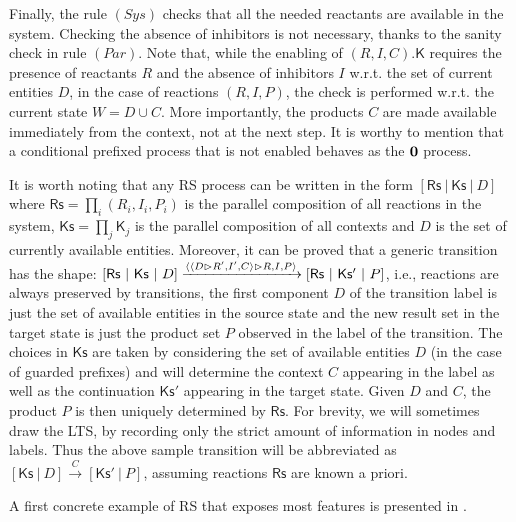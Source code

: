 Finally, the rule $(\textit{Sys})$ checks that all the needed reactants are available in the system. Checking the absence of inhibitors  is not necessary, thanks to the sanity check in rule $(\textit{Par})$.
Note that, while the enabling of $(R,I,C).\mathsf{K}$ requires the presence of reactants $R$ and the absence of inhibitors $I$ w.r.t. the set of current entities $D$, in the case of reactions $(R,I,P)$, the check is performed w.r.t. the current state $W=D\cup C$.
More importantly, the products $C$ are made available immediately from the context, not at the next step.
It is worthy to mention that a conditional prefixed process that is not enabled behaves as the $\mathbf{0}$ process.

\begin{remark}\label{rem:shortlts}
It is worth noting that any RS process can be written in the form $[\mathsf{Rs}~|~\mathsf{Ks}~|~D]$ where $\mathsf{Rs}=\prod_i (R_i,I_i,P_i)$ is the parallel composition of all reactions in the system, $\mathsf{Ks}=\prod_j \mathsf{K}_j$ is the parallel composition of all contexts and $D$ is the set of currently available entities. 
Moreover, it can be proved that a generic transition has the shape:
$[\mathsf{Rs}~|~\mathsf{Ks}~|~D]\xrightarrow{\langle \langle D\vartriangleright R',I',C\rangle\vartriangleright R,I,P\rangle}[\mathsf{Rs}~|~\mathsf{Ks'}~|~P]$,
i.e., reactions are always preserved by transitions, the first component $D$ of the transition label is just the set of available entities in the source state and the new result set in the target state is just the product set $P$ observed in the label of the transition. The choices in $\mathsf{Ks}$ are taken by considering the set of available entities $D$ (in the case of guarded prefixes) and will determine the context $C$ appearing in the label as well as the continuation $\mathsf{Ks'}$ appearing in the target state. Given $D$ and $C$, the product $P$ is then uniquely determined by $\mathsf{Rs}$. For brevity, we will sometimes draw the LTS, by recording only the strict amount of information in nodes and labels. Thus the above sample transition  
will be abbreviated as $[\mathsf{Ks}~|~D]\xrightarrow{C}[\mathsf{Ks'}~|~P]$, assuming reactions $\mathsf{Rs}$ are known a priori.
\end{remark}

A first concrete example of RS that exposes most features is presented in .

